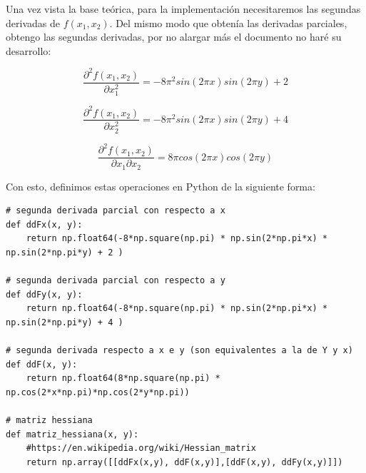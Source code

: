 \documentclass[12pt, spanish]{article}
\begin{document}
Una vez vista la base teórica, para la implementación necesitaremos las segundas derivadas de $f(x_1, x_2)$. Del mismo modo que obtenía las derivadas parciales, obtengo las segundas derivadas, por no alargar más el documento no haré su desarrollo:

$$\frac{\partial^{2} f(x_1, x_2)}{\partial x_1^2} =  - 8 \pi^2 sin(2 \pi x) sin(2 \pi y) + 2$$

$$\frac{\partial^{2} f(x_1, x_2)}{\partial x_2^2} =  - 8 \pi^2 sin(2 \pi x) sin(2 \pi y) + 4$$

$$ \frac{\partial^{2} f(x_1, x_2)}{\partial x_1 \partial x_2} = 8\pi cos(2\pi x) cos(2 \pi y) $$

Con esto, definimos estas operaciones en Python de la siguiente forma:

\begin{lstlisting}
# segunda derivada parcial con respecto a x
def ddFx(x, y):
	return np.float64(-8*np.square(np.pi) * np.sin(2*np.pi*x) * np.sin(2*np.pi*y) + 2 )

# segunda derivada parcial con respecto a y
def ddFy(x, y):
	return np.float64(-8*np.square(np.pi) * np.sin(2*np.pi*x) * np.sin(2*np.pi*y) + 4 )

# segunda derivada respecto a x e y (son equivalentes a la de Y y x)
def ddF(x, y):
	return np.float64(8*np.square(np.pi) * np.cos(2*x*np.pi)*np.cos(2*y*np.pi))

# matriz hessiana
def matriz_hessiana(x, y):
	#https://en.wikipedia.org/wiki/Hessian_matrix
	return np.array([[ddFx(x,y), ddF(x,y)],[ddF(x,y), ddFy(x,y)]])
\end{lstlisting}

\newpage
\end{document}
